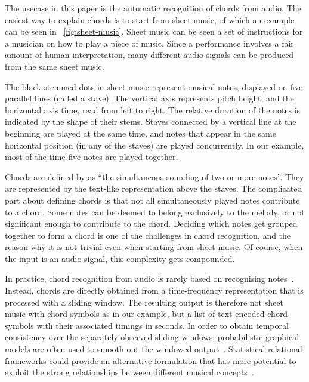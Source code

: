 \documentclass[letterpaper]{article} %
\newcommand{\figref}[1]{\figurename~\ref{fig:#1}} %
\begin{document}
The usecase in this paper is the automatic recognition of chords from audio. The easiest way to explain chords is to start from sheet music, of which an example can be seen in \figref{sheet-music}. Sheet music can be seen a set of instructions for a musician on how to play a piece of music.
Since a performance involves a fair amount of human interpretation, many different audio signals can be produced from the same sheet music.

The black stemmed dots in sheet music represent musical notes, displayed on five parallel lines (called a stave). The vertical axis represents pitch height, and the horizontal axis time, read from left to right. The relative duration of the notes is indicated by the shape of their stems. Staves connected by a vertical line at the beginning are played at the same time, and notes that appear in the same horizontal position (in any of the staves) are played concurrently. In our example, most of the time five notes are played together.

Chords are defined by \citeauthor{grovemusic} as ``the simultaneous sounding of two or more notes''. They are represented by the text-like representation above the staves. The complicated part about defining chords is that not all simultaneously played notes contribute to a chord. Some notes can be deemed to belong exclusively to the melody, or not significant enough to contribute to the chord. Deciding which notes get grouped together to form a chord is one of the challenges in chord recognition, and the reason why it is not trivial even when starting from sheet music. Of course, when the input is an audio signal, this complexity gets compounded.

In practice, chord recognition from audio is rarely based on recognising notes~\cite{pauwels2019ismir}. Instead, chords are directly obtained from a time-frequency representation that is processed with a sliding window. The resulting output is therefore not sheet music with chord symbols as in our example, but a list of text-encoded chord symbols with their associated timings in seconds. In order to obtain temporal consistency over the separately observed sliding windows, probabilistic graphical models are often used to smooth out the windowed output~\cite{pauwels2019ismir}. Statistical relational frameworks could provide an alternative formulation that has more potential to exploit the strong relationships between different musical concepts~\cite{papadopoulos2017taslp}.
\end{document}

